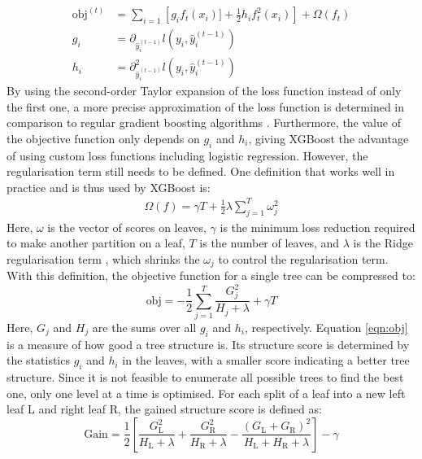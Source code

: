 \begin{align}
  \text{obj}^{(t)} &= \sum_{i=1} \left[g_i f_t(x_i)] + \frac{1}{2}h_i f_t^2(x_i)\right] + \Omega(f_t)  \\
  g_i &= \partial_{\hat{y}_i^{(t-1)}} l(y_i, \hat{y}_i^{(t-1)}) \\
  h_i &= \partial^2_{\hat{y}_i^{(t-1)}} l(y_i, \hat{y}_i^{(t-1)})
\end{align}
By using the second-order Taylor expansion of the loss function instead of only the first one, a more precise approximation of the loss function is determined in comparison
to regular gradient boosting algorithms \cite{newton_boosting}.
Furthermore, the value of the objective function only depends on $g_i$ and $h_i$, giving XGBoost the advantage of using custom loss functions including logistic regression.
However, the regularisation term still needs to be defined. One definition that works well in practice and is thus used by XGBoost is:
\begin{align}
  \Omega (f) = \gamma T + \frac{1}{2}\lambda \sum_{j=1}^T \omega_j^2
\end{align}
Here, $\omega$ is the vector of scores on leaves, $\gamma$ is the minimum loss reduction required to make
another partition on a leaf, $T$ is the number of leaves, and $\lambda$ is the Ridge regularisation term \cite{ridge}, which shrinks the $\omega_j$ to control the
regularisation term. \\
With this definition, the objective function for a single tree can be compressed to:
\begin{equation} \label{eqn:obj}
  \text{obj} = -\frac{1}{2}\sum_{j=1}^T \frac{G_j^2}{H_j + \lambda} + \gamma T
\end{equation}
Here, $G_j$ and $H_j$ are the sums over all $g_i$ and $h_i$, respectively. Equation \ref{eqn:obj} is a measure of how good a tree structure is. Its structure score
is determined by the statistics $g_i$ and $h_i$ in the leaves, with a smaller score indicating a better tree structure.
Since it is not feasible to enumerate all possible trees to find the best one, only one level at a time is optimised.
For each split of a leaf into a new left leaf L and right leaf R, the gained structure score is defined as:
\begin{equation}
  \text{Gain} = \frac{1}{2}\left[\frac{G_{\text{L}}^2}{H_{\text{L}} + \lambda} + \frac{G_{\text{R}}^2}{H_{\text{R}} + \lambda} - \frac{(G_{\text{L}} + G_{\text{R}})^2}{H_{\text{L}}+H_{\text{R}}+\lambda}\right] -\gamma
\end{equation}

